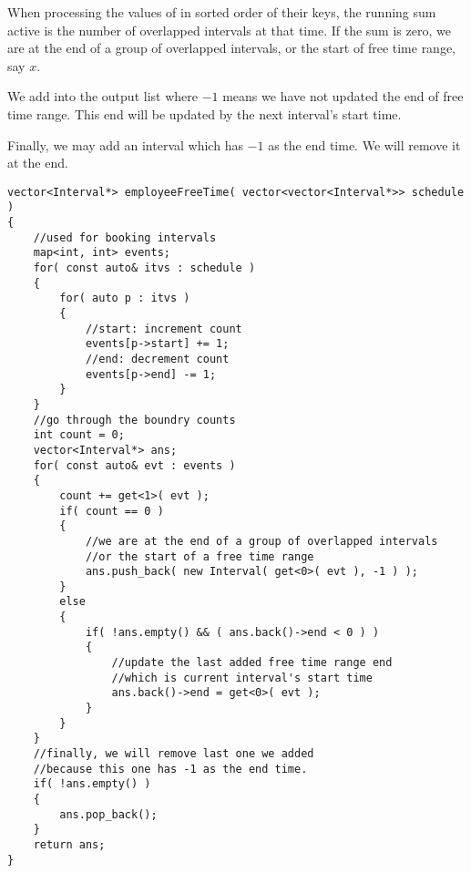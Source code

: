 When processing the values of  in sorted order of their keys, the running sum active is the number of overlapped intervals at that time. If the sum is zero, we are at the end of a group of overlapped intervals, or the start of free time range, say $x$. 

We add \fcj{[x,-1]} into the output list where $-1$ means we have not updated the end of free time range. This end will be updated by the next interval's start time.

Finally, we may add an interval which has $-1$ as the end time. We will remove it at the end.

\begin{lstlisting}[style=customc, caption={Boundry Count}]
vector<Interval*> employeeFreeTime( vector<vector<Interval*>> schedule )
{
    //used for booking intervals
    map<int, int> events;
    for( const auto& itvs : schedule )
    {
        for( auto p : itvs )
        {
            //start: increment count
            events[p->start] += 1;
            //end: decrement count
            events[p->end] -= 1;
        }
    }
    //go through the boundry counts
    int count = 0;
    vector<Interval*> ans;
    for( const auto& evt : events )
    {
        count += get<1>( evt );
        if( count == 0 )
        {
            //we are at the end of a group of overlapped intervals
            //or the start of a free time range
            ans.push_back( new Interval( get<0>( evt ), -1 ) );
        }
        else
        {
            if( !ans.empty() && ( ans.back()->end < 0 ) )
            {
                //update the last added free time range end
                //which is current interval's start time
                ans.back()->end = get<0>( evt );
            }
        }
    }
    //finally, we will remove last one we added
    //because this one has -1 as the end time.
    if( !ans.empty() )
    {
        ans.pop_back();
    }
    return ans;
}
\end{lstlisting}
